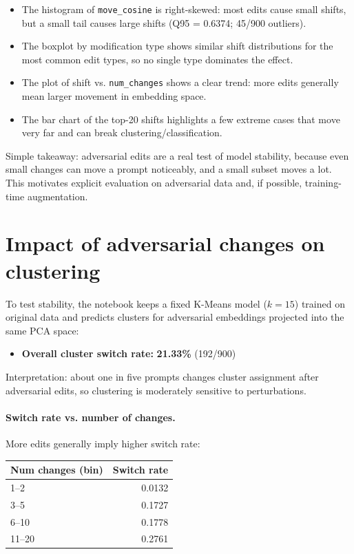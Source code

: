 \documentclass[11pt,a4paper]{article}
\begin{document}
\begin{itemize}[leftmargin=*]
\item The histogram of \texttt{move\_cosine} is right-skewed: most edits cause small shifts, but a small tail causes large shifts (Q95 = 0.6374; 45/900 outliers).
\item The boxplot by modification type shows similar shift distributions for the most common edit types, so no single type dominates the effect.
\item The plot of shift vs. \texttt{num\_changes} shows a clear trend: more edits generally mean larger movement in embedding space.
\item The bar chart of the top-20 shifts highlights a few extreme cases that move very far and can break clustering/classification.
\end{itemize}
 Simple takeaway: adversarial edits are a real test of model stability, because even small changes can move a prompt noticeably, and a small subset moves a lot. This motivates explicit evaluation on adversarial data and, if possible, training-time augmentation.

\section{Impact of adversarial changes on clustering}
To test stability, the notebook keeps a fixed K-Means model ($k=15$) trained on original data and predicts clusters for adversarial embeddings projected into the same PCA space:
\begin{itemize}[leftmargin=*]
\item \textbf{Overall cluster switch rate:} \textbf{21.33\%} (192/900)
\end{itemize}
Interpretation: about one in five prompts changes cluster assignment after adversarial edits, so clustering is moderately sensitive to perturbations.

\paragraph{Switch rate vs. number of changes.}
More edits generally imply higher switch rate:
\begin{center}
\begin{tabular}{lr}
\toprule
Num changes (bin) & Switch rate \\
\midrule
1--2 & 0.0132 \\
3--5 & 0.1727 \\
6--10 & 0.1778 \\
11--20 & 0.2761 \\
\bottomrule
\end{tabular}
\end{center}
\end{document}
